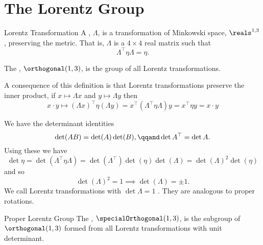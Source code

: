 \documentclass[fleqn]{NotesClass}
\newcommand{\minkowskiSpace}{\reals^{1,3}}
\newcommand{\minkowskiMetric}{\eta}
\newcommand{\trans}{\top}
\begin{document}
    \section{The Lorentz Group}
    \begin{dfn}{Lorentz Transformation}{}
        A , \(\Lambda\), is a transformation of Minkowski space, \(\minkowskiSpace\), preserving the metric.
        That is, \(\Lambda\) is a \(4 \times 4\) real matrix such that
        \begin{equation}
            \Lambda^\trans \minkowskiMetric \Lambda = \minkowskiMetric.
        \end{equation}
        
        The , \(\orthogonal(1, 3)\), is the group of all Lorentz transformations.
    \end{dfn}
    
    A consequence of this definition is that Lorentz transformations preserve the inner product, if \(x \mapsto \Lambda x\) and \(y \mapsto \Lambda y\) then
    \begin{equation}
        x \cdot y \mapsto (\Lambda x)^\trans \minkowskiMetric (\Lambda y) = x^\trans (\Lambda^\trans \minkowskiMetric \Lambda) y = x^\trans \minkowskiMetric y = x \cdot y
    \end{equation}
    
    We have the determinant identities
    \begin{equation}
        \det(AB) = \det(A)\det(B), \qqand \det A^\trans = \det A.
    \end{equation}
    Using these we have
    \begin{equation}
        \det \minkowskiMetric = \det(\Lambda^\trans \minkowskiMetric \Lambda) = \det(\Lambda^\trans)\det(\minkowskiMetric)\det(\Lambda) = \det(\Lambda)^2\det(\minkowskiMetric)
    \end{equation}
    and so
    \begin{equation}
        \det(\Lambda)^2 = 1 \implies \det(\Lambda) = \pm 1.
    \end{equation}
    We call Lorentz transformations with \(\det \Lambda = 1\) .
    They are analogous to proper rotations.
    
    \begin{dfn}{Proper Lorentz Group}{}
        The , \(\specialOrthogonal(1, 3)\), is the subgroup of \(\orthogonal(1, 3)\) formed from all Lorentz transformations with unit determinant.
    \end{dfn}
    
\end{document}

